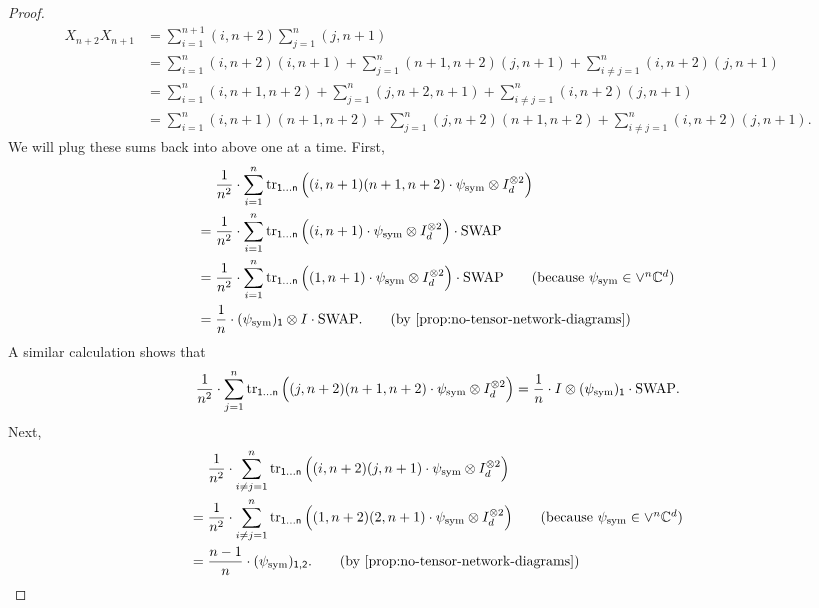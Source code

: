 \documentclass{article}
\newcommand{\swap}{\mathrm{SWAP}}
\newcommand{\reg}[1]{\mathsf{#1}}
\begin{document}
\begin{proof}
\begin{align*}
        X_{n+2} X_{n+1}
        &= \sum_{i=1}^{n+1} (i, n+2) \sum_{j = 1}^n (j, n+1)\\
        &= \sum_{i=1}^n (i, n+2)(i, n+1) + \sum_{j=1}^n (n+1, n+2) (j, n+1) + \sum_{i \neq j=1}^n (i, n+2)(j, n+1)\\
        &= \sum_{i=1}^n (i, n+1, n+2) + \sum_{j=1}^n (j, n+2, n+1) +\sum_{i \neq j=1}^n (i, n+2)(j, n+1)\\
        &= \sum_{i=1}^n (i, n+1)(n+1, n+2) + \sum_{j=1}^n (j, n+2)(n+1, n+2) +\sum_{i \neq j=1}^n (i, n+2)(j, n+1).
    \end{align*}
    We will plug these sums back into  above one at a time. First,
    \begin{align*}
        &\frac{1}{n^2}\cdot\sum_{i=1}^n \tr_{\reg{1}\dots\reg{n}}\Big((i,n+1)(n+1, n+2) \cdot \psi_{\mathrm{sym}} \otimes I_d^{\otimes 2}\Big)\\
        ={}&\frac{1}{n^2}\cdot\sum_{i=1}^n \tr_{\reg{1}\dots\reg{n}}\Big((i,n+1) \cdot \psi_{\mathrm{sym}} \otimes I_d^{\otimes 2}\Big) \cdot \swap\\
        ={}&\frac{1}{n^2}\cdot\sum_{i=1}^n \tr_{\reg{1}\dots\reg{n}}\Big((1,n+1) \cdot \psi_{\mathrm{sym}} \otimes I_d^{\otimes 2}\Big) \cdot \swap \tag{because $\psi_{\mathrm{sym}} \in \lor^n \C^d$}\\
        ={}&\frac{1}{n}\cdot (\psi_{\mathrm{sym}})_{\reg{1}} \otimes I \cdot \swap. \tag{by \Cref{prop:no-tensor-network-diagrams}}
    \end{align*}
    A similar calculation shows that
    \begin{equation*}
        \frac{1}{n^2}\cdot\sum_{j=1}^n \tr_{\reg{1}\dots\reg{n}}\Big((j, n+2)(n+1, n+2) \cdot \psi_{\mathrm{sym}} \otimes I_d^{\otimes 2}\Big)
        = \frac{1}{n}\cdot I \otimes (\psi_{\mathrm{sym}})_{\reg{1}} \cdot \swap.
    \end{equation*}
    Next,
    \begin{align*}
    &\frac{1}{n^2}\cdot\sum_{i\neq j=1}^n \tr_{\reg{1}\dots\reg{n}}\Big((i,n+2)(j,n+1) \cdot \psi_{\mathrm{sym}} \otimes I_d^{\otimes 2}\Big)\\
    ={}&\frac{1}{n^2}\cdot\sum_{i\neq j=1}^n \tr_{\reg{1}\dots\reg{n}}\Big((1,n+2)(2,n+1) \cdot \psi_{\mathrm{sym}} \otimes I_d^{\otimes 2}\Big) \tag{because $\psi_{\mathrm{sym}} \in \lor^n \C^d$}\\
    ={}& \frac{n-1}{n}\cdot (\psi_{\mathrm{sym}})_{\reg{1},\reg{2}}. \tag{by \Cref{prop:no-tensor-network-diagrams}}
    \end{align*}

\end{proof}
\end{document}
